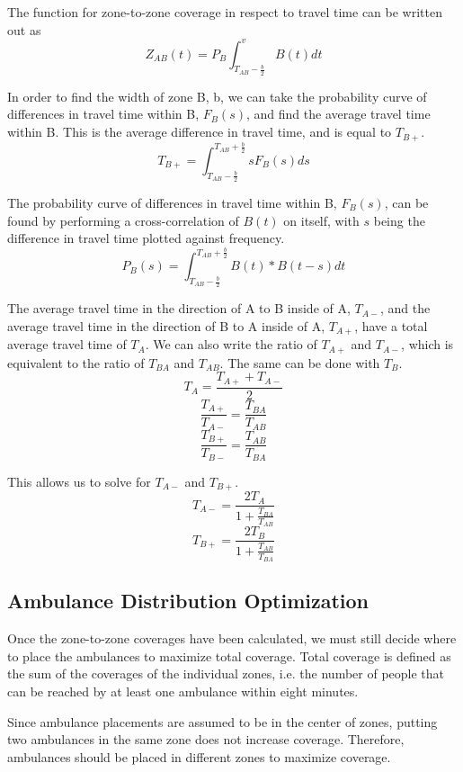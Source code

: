 \documentclass[notitlepage, 12pt]{article}
\begin{document}

The function for zone-to-zone coverage in respect to travel time can be written out as
$$Z_{AB}(t) = P_B \int^v_{T_{AB} - \frac{b}{2}} B(t) dt$$

In order to find the width of zone B, b, we can take the probability curve of differences in travel time within B,
$F_B(s)$, and find the average travel time within B. This is the average difference in travel time, and is equal to $T_{B+}$.
$$T_{B+} = \int^{T_{AB} + \frac{b}{2}}_{T_{AB} - \frac{b}{2}} s F_B(s) ds$$

The probability curve of differences in travel time within B, $F_B(s)$, can be found by performing a cross-correlation
of $B(t)$ on itself, with $s$ being the difference in travel time plotted against frequency.
$$P_B(s) =\int^{T_{AB} + \frac{b}{2}}_{T_{AB} - \frac{b}{2}} B(t) * B(t-s) dt$$

The average travel time in the direction of A to B inside of A, $T_{A-}$, and the average travel time in the direction of B to A
inside of A, $T_{A+}$, have a total average travel time of $T_A$. We can also write the ratio of $T_{A+}$ and $T_{A-}$,
which is equivalent to the ratio of $T_{BA}$ and $T_{AB}$. The same can be done with $T_{B}$.
$$T_A = \frac{T_{A+} + T_{A-}}{2}$$
$$\frac{T_{A+}}{T_{A-}} = \frac{T_{BA}}{T_{AB}}$$
$$\frac{T_{B+}}{T_{B-}} = \frac{T_{AB}}{T_{BA}}$$

This allows us to solve for $T_{A-}$  and $T_{B+}$.
$$T_{A-} = \frac {2T_A}{1+ \frac{T_{BA}}{T_{AB}}}$$
$$T_{B+} = \frac {2T_B}{1+ \frac{T_{AB}}{T_{BA}}}$$


\subsection{Ambulance Distribution Optimization}
Once the zone-to-zone coverages have been calculated, we must still decide where to place
the ambulances to maximize total coverage. Total coverage is defined as the sum of the coverages
of the individual zones, i.e. the number of people that can be reached by at least one ambulance
within eight minutes.

Since ambulance placements are assumed to be in the center of zones, putting two ambulances in the same
zone does not increase coverage. Therefore, ambulances should be placed in different zones to maximize
coverage.
\end{document}
